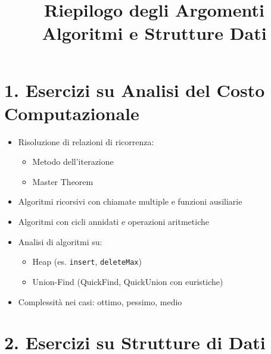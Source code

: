 \documentclass[a4paper,12pt]{article}
\title{Riepilogo degli Argomenti \\ \large Algoritmi e Strutture Dati}
\author{}
\date{}
\begin{document}
\maketitle

\section*{1. Esercizi su Analisi del Costo Computazionale}

\begin{itemize}[itemsep=0.3em]
  \item Risoluzione di relazioni di ricorrenza:
  \begin{itemize}
    \item Metodo dell’iterazione
    \item Master Theorem
  \end{itemize}
  \item Algoritmi ricorsivi con chiamate multiple e funzioni ausiliarie
  \item Algoritmi con cicli annidati e operazioni aritmetiche
  \item Analisi di algoritmi su:
  \begin{itemize}
    \item Heap (es. \texttt{insert}, \texttt{deleteMax})
    \item Union-Find (QuickFind, QuickUnion con euristiche)
  \end{itemize}
  \item Complessità nei casi: ottimo, pessimo, medio
\end{itemize}

\vspace{1em}
\section*{2. Esercizi su Strutture di Dati}
\end{document}
